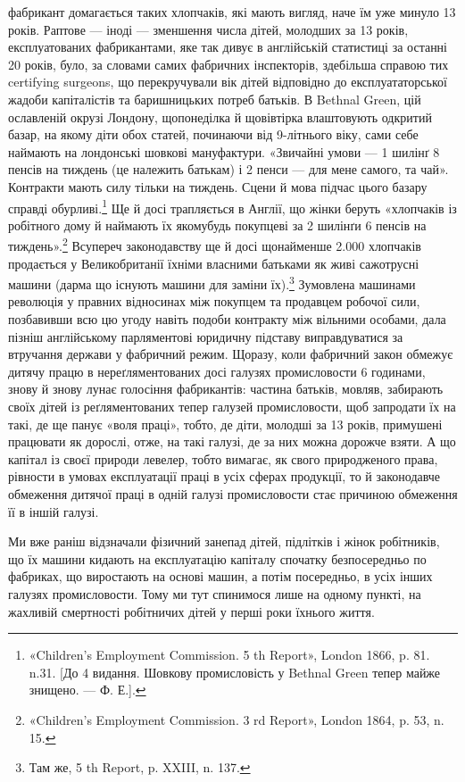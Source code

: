 \parcont{}  %
фабрикант домагається таких хлопчаків, які мають вигляд, наче
їм уже минуло 13 років. Раптове — іноді — зменшення числа
дітей, молодших за 13 років, експлуатованих фабрикантами, яке
так дивує в англійській статистиці за останні 20 років, було, за
словами самих фабричних інспекторів, здебільша справою тих
certifying surgeons, що перекручували вік дітей відповідно до
експлуататорської жадоби капіталістів та баришницьких потреб
батьків. В Bethnal Green, цій ославленій окрузі Лондону, щопонеділка
й щовівтірка влаштовують одкритий базар, на якому
діти обох статей, починаючи від 9-літнього віку, сами себе наймають
на лондонські шовкові мануфактури. «Звичайні умови —
1 шилінґ 8 пенсів на тиждень (це належить батькам) і 2 пенси —
для мене самого, та чай». Контракти мають силу тільки на тиждень.
Сцени й мова підчас цього базару справді обурливі.\footnote{
«Children’s Employment Commission. 5 th Report», London 1866,
p. 81. n.31. [До 4 видання. Шовкову промисловість у Bethnal Green тепер
майже знищено. — Ф. Е.].
} Ще й досі
трапляється в Англії, що жінки беруть «хлопчаків із робітного
дому й наймають їх якомубудь покупцеві за 2 шилінґи
6 пенсів на тиждень».\footnote{
«Children’s Employment Commission. 3 rd Report», London 1864,
p. 53, n. 15.
} Всупереч законодавству ще й досі щонайменше
2.000 хлопчаків продається у Великобританії їхніми
власними батьками як живі сажотрусні машини (дарма що існують
машини для заміни їх).\footnote{
Там же, 5 th Report, p. XXIII, n. 137.
} Зумовлена машинами революція у
правних відносинах між покупцем та продавцем робочої сили,
позбавивши всю цю угоду навіть подоби контракту між вільними
особами, дала пізніш англійському парляментові юридичну
підставу виправдуватися за втручання держави у фабричний
режим. Щоразу, коли фабричний закон обмежує дитячу працю
в нереґляментованих досі галузях промисловости 6 годинами,
знову й знову лунає голосіння фабрикантів: частина батьків,
мовляв, забирають своїх дітей із реґляментованих тепер галузей
промисловости, щоб запродати їх на такі, де ще панує «воля
праці», тобто, де діти, молодші за 13 років, примушені працювати
як дорослі, отже, на такі галузі, де за них можна дорожче
взяти. А що капітал із своєї природи левелер, тобто вимагає,
як свого природженого права, рівности в умовах експлуатації
праці в усіх сферах продукції, то й законодавче обмеження дитячої
праці в одній галузі промисловости стає причиною обмеження
її в іншій галузі.

Ми вже раніш відзначали фізичний занепад дітей, підлітків
і жінок робітників, що їх машини кидають на експлуатацію капіталу
спочатку безпосередньо по фабриках, що виростають на
основі машин, а потім посередньо, в усіх інших галузях промисловости.
Тому ми тут спинимося лише на одному пункті, на жахливій
смертності робітничих дітей у перші роки їхнього життя.
\parbreak{}  %
